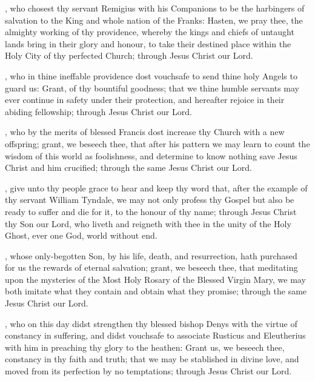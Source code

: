 , who chosest thy servant Remigius with his Companions to be the harbingers of salvation to the King and whole nation of the Franks: Hasten, we pray thee, the almighty working of thy providence, whereby the kings and chiefs of untaught lands bring in their glory and honour, to take their destined place within the Holy City of thy perfected Church; through Jesus Christ our Lord.

, who in thine ineffable providence dost vouchsafe to send thine holy Angels to guard us: Grant, of thy bountiful goodness; that we thine humble servants may ever continue in safety under their protection, and hereafter rejoice in their abiding fellowship; through Jesus Christ our Lord.

, who by the merits of blessed Francis dost increase thy Church with a new offspring; grant, we beseech thee, that after his pattern we may learn to count the wisdom of this world as foolishness, and determine to know nothing save Jesus Christ and him crucified; through the same Jesus Christ our Lord.

, give unto thy people grace to hear and keep thy word that, after the example of thy servant William Tyndale, we may not only profess thy Gospel but also be ready to suffer and die for it, to the honour of thy name; through Jesus Christ thy Son our Lord, who liveth and reigneth with thee in the unity of the Holy Ghost, ever one God, world without end.

, whose only-begotten Son, by his life, death, and resurrection, hath purchased for us the rewards of eternal salvation; grant, we beseech thee, that meditating upon the mysteries of the Most Holy Rosary of the Blessed Virgin Mary, we may both imitate what they contain and obtain what they promise; through the same Jesus Christ our Lord.

, who on this day didst strengthen thy blessed bishop Denys with the virtue of constancy in suffering, and didst vouchsafe to associate Rusticus and Eleutherius with him in preaching thy glory to the heathen: Grant us, we beseech thee, constancy in thy faith and truth; that we may be stablished in divine love, and moved from its perfection by no temptations; through Jesus Christ our Lord.

